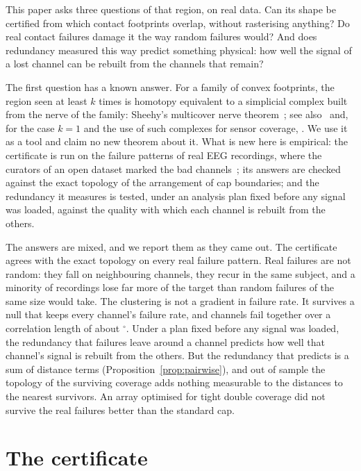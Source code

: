 \documentclass[11pt]{amsart}
\theoremstyle{definition}
\theoremstyle{remark}
\begin{document}
This paper asks three questions of that region, on real data. Can its shape be
certified from which contact footprints overlap, without rasterising
anything? Do real contact failures damage it the way random failures would? And
does redundancy measured this way predict something physical: how well the
signal of a lost channel can be rebuilt from the channels that remain?

The first question has a known answer. For a family of convex footprints, the
region seen at least $k$ times is homotopy equivalent to a simplicial complex
built from the nerve of the family: Sheehy's multicover nerve
theorem~\cite{Sheehy2012}; see also~\cite{EdelsbrunnerOsang2021,CavannaGardnerSheehy2017}
and, for the case $k=1$ and the use of such complexes for sensor coverage,
\cite{Borsuk1948,deSilvaGhrist2007}. We use it as a tool and claim no new
theorem about it. What is new here is empirical: the certificate is run on
the failure patterns of \nRec{} real EEG recordings, where the curators of an
open dataset marked the bad channels~\cite{HatlestadHall2022,ds003775};
its answers are checked against the exact topology of the arrangement of cap
boundaries; and the redundancy it measures is tested, under an analysis plan
fixed before any signal was loaded, against the quality with which each
channel is rebuilt from the others.

The answers are mixed, and we report them as they came out. The certificate
agrees with the exact topology on every real failure pattern. Real failures
are not random: they fall on neighbouring channels, they recur in the same
subject, and a minority of recordings lose far more of the target than random
failures of the same size would take. The clustering is not a gradient in failure rate. It survives a null that
keeps every channel's failure rate, and channels fail together over a
correlation length of about \xiOne$^\circ$.
Under a plan fixed before any signal was loaded, the redundancy that failures
leave around a channel predicts how well that channel's signal is rebuilt
from the others. But the redundancy that predicts is a sum of distance terms
(Proposition~\ref{prop:pairwise}), and out of sample the topology of the
surviving coverage adds nothing measurable to the distances to the nearest
survivors.
An array optimised for tight double coverage did not survive the real
failures better than the standard cap.

\section{The certificate}\label{sec:framework}
\end{document}
